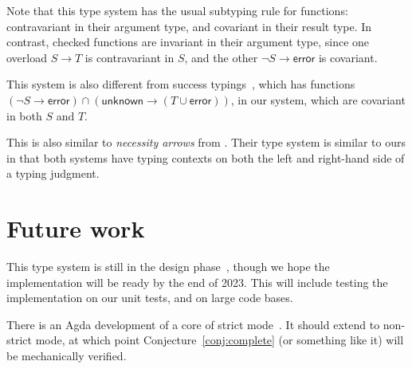 \documentclass[sigplan]{acmart}
\newcommand{\ERROR}{\mathsf{error}}
\newcommand{\UNKNOWN}{\mathsf{unknown}}
\newcommand{\fun}{\mathbin{\rightarrow}}
\begin{document}
Note that this type system has the usual subtyping rule for
functions: contravariant in their argument type, and
covariant in their result type. In contrast, checked functions
are invariant in their argument type, since one overload
$S \fun T$ is contravariant in $S$, and the other $\neg S \fun \ERROR$
is covariant.

This system is also different from  success
typings~\cite{SuccessTyping}, which has functions
$(\neg S \fun \ERROR) \cap (\UNKNOWN \fun (T \cup \ERROR))$,
in our system, which are covariant in both $S$ and $T$.

This is also similar to \emph{necessity arrows} from \cite{RW23:IllTyped}. Their
type system is similar to ours in that both systems have typing contexts on both
the left and right-hand side of a typing judgment.

\section{Future work}

This type system is still in the design phase~\cite{NewNonStrictRFC}, though we hope
the implementation will be ready by the end of 2023. This will include
testing the implementation on our unit tests, and on large code bases.

There is an Agda development of a core of strict mode~\cite{BJ23:agda-typeck}.  It
should extend to non-strict mode, at which point
Conjecture~\ref{conj:complete} (or something like it)
will be mechanically verified.
  
 
\end{document}
